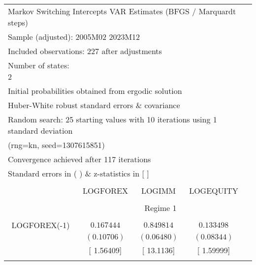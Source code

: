 \begin{tabular}{lrrrr}
\multicolumn{5}{l}{Markov Switching Intercepts VAR Estimates (BFGS / Marquardt steps)}\\
\multicolumn{3}{l}{Sample (adjusted): 2005M02 2023M12}&\multicolumn{1}{c}{}&\multicolumn{1}{c}{}\\
\multicolumn{3}{l}{Included observations: 227 after adjustments}&\multicolumn{1}{c}{}&\multicolumn{1}{c}{}\\
\multicolumn{1}{l}{Number of states: 2}&\multicolumn{1}{c}{}&\multicolumn{1}{c}{}&\multicolumn{1}{c}{}&\multicolumn{1}{c}{}\\
\multicolumn{4}{l}{Initial probabilities obtained from ergodic solution}&\multicolumn{1}{c}{}\\
\multicolumn{4}{l}{Huber-White robust standard errors \& covariance}&\multicolumn{1}{c}{}\\
\multicolumn{6}{l}{Random search: 25 starting values with 10 iterations using 1 standard deviation}\\
\multicolumn{2}{l}{(rng=kn, seed=1307615851)}&\multicolumn{1}{c}{}&\multicolumn{1}{c}{}&\multicolumn{1}{c}{}\\
\multicolumn{3}{l}{Convergence achieved after 117 iterations}&\multicolumn{1}{c}{}&\multicolumn{1}{c}{}\\
\multicolumn{3}{l}{Standard errors in ( ) \& z-statistics in [ ]}&\multicolumn{1}{c}{}&\multicolumn{1}{c}{}\\
[4.5pt] \hline \\ [-4.5pt]
\multicolumn{1}{c}{}&\multicolumn{1}{c}{LOGFOREX}&\multicolumn{1}{c}{LOGIMM}&\multicolumn{1}{c}{LOGEQUITY}&\multicolumn{1}{c}{}\\
[4.5pt] \hline \\ [-4.5pt]
\multicolumn{1}{c}{}&\multicolumn{3}{c}{Regime 1}&\multicolumn{1}{c}{}\\
[4.5pt] \hline \\ [-4.5pt]
\multicolumn{1}{c}{LOGFOREX(-1)}&\multicolumn{1}{c}{$0.167444$}&\multicolumn{1}{c}{$0.849814$}&\multicolumn{1}{c}{$0.133498$}&\multicolumn{1}{c}{}\\
\multicolumn{1}{c}{}&\multicolumn{1}{c}{$(0.10706)$}&\multicolumn{1}{c}{$(0.06480)$}&\multicolumn{1}{c}{$(0.08344)$}&\multicolumn{1}{c}{}\\
\multicolumn{1}{c}{}&\multicolumn{1}{c}{[ 1.56409]}&\multicolumn{1}{c}{[ 13.1136]}&\multicolumn{1}{c}{[ 1.59999]}&\multicolumn{1}{c}{}\\
\multicolumn{1}{c}{}&\multicolumn{1}{c}{}&\multicolumn{1}{c}{}&\multicolumn{1}{c}{}&\multicolumn{1}{c}{}\\

\end{tabular}
